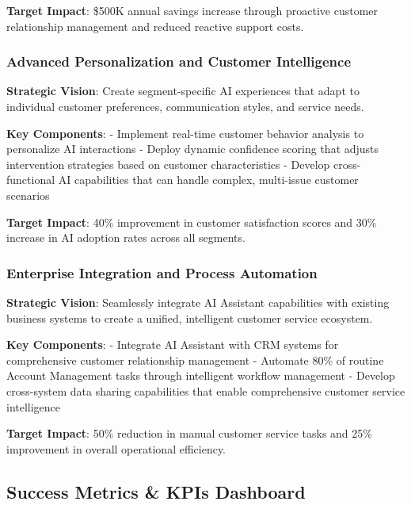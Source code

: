 \documentclass[
  letterpaper,
  DIV=11,
  numbers=noendperiod]{scrartcl}
\begin{document}
\textbf{Target Impact}: \$500K annual savings increase through proactive
customer relationship management and reduced reactive support costs.

\subsubsection{Advanced Personalization and Customer
Intelligence}\label{advanced-personalization-and-customer-intelligence}

\textbf{Strategic Vision}: Create segment-specific AI experiences that
adapt to individual customer preferences, communication styles, and
service needs.

\textbf{Key Components}: - Implement real-time customer behavior
analysis to personalize AI interactions - Deploy dynamic confidence
scoring that adjusts intervention strategies based on customer
characteristics - Develop cross-functional AI capabilities that can
handle complex, multi-issue customer scenarios

\textbf{Target Impact}: 40\% improvement in customer satisfaction scores
and 30\% increase in AI adoption rates across all segments.

\subsubsection{Enterprise Integration and Process
Automation}\label{enterprise-integration-and-process-automation}

\textbf{Strategic Vision}: Seamlessly integrate AI Assistant
capabilities with existing business systems to create a unified,
intelligent customer service ecosystem.

\textbf{Key Components}: - Integrate AI Assistant with CRM systems for
comprehensive customer relationship management - Automate 80\% of
routine Account Management tasks through intelligent workflow management
- Develop cross-system data sharing capabilities that enable
comprehensive customer service intelligence

\textbf{Target Impact}: 50\% reduction in manual customer service tasks
and 25\% improvement in overall operational efficiency.

\subsection{Success Metrics \& KPIs
Dashboard}\label{success-metrics-kpis-dashboard}
\end{document}
